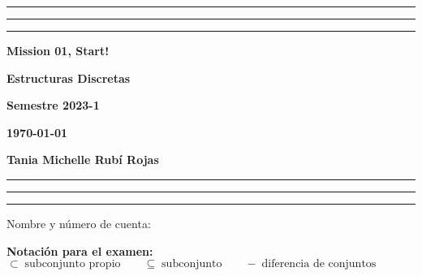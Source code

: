 \documentclass[12pt, a4paper]{exam}
\begin{document}
    \centering
    \hrule \hrule \hrule 
    \vspace{5mm}
    \begin{minipage}[c]{0.8\textwidth}
        \begin{center}
            {\large\textbf{Mission 01, Start!} \par
            \large \textbf{Estructuras Discretas} \par
            \large \textbf{Semestre 2023-1} \par
            \large \textbf{\today}	\par}
        \end{center}
    \end{minipage}

    \vspace{0.2in}
    \noindent
    \textbf{Tania Michelle Rubí Rojas}
    \vspace{2mm}
    \hrule \hrule \hrule 

    \vspace{5mm}
    \noindent
    Nombre y número de cuenta: \hrulefill\

    \vspace{5mm}
    \noindent
    \textbf{Notación para el examen:} $\subset \; \text{subconjunto propio} 
    \quad \quad \subseteq \; \text{subconjunto} \quad \quad - \; 
    \text{diferencia de conjuntos}$
\end{document}
